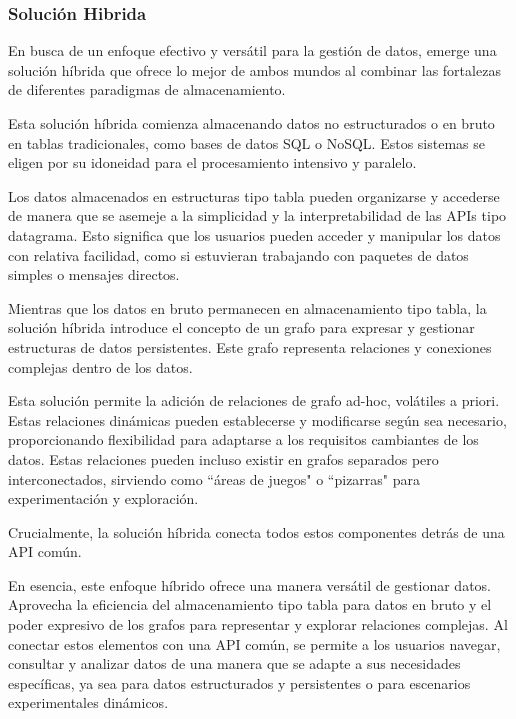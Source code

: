 \documentclass[pdflatex,sn-mathphys-num]{sn-jnl}
\theoremstyle{thmstyleone}%
\theoremstyle{thmstyletwo}%
\theoremstyle{thmstylethree}%
\begin{document}
\subsubsection{Solución Hibrida}

En busca de un enfoque efectivo y versátil para la gestión de datos, emerge una solución híbrida que ofrece lo mejor de ambos mundos al combinar las fortalezas de diferentes paradigmas de almacenamiento.

Esta solución híbrida comienza almacenando datos no estructurados o en bruto en tablas tradicionales, como bases de datos SQL o NoSQL. Estos sistemas se eligen por su idoneidad para el procesamiento intensivo y paralelo.

Los datos almacenados en estructuras tipo tabla pueden organizarse y accederse de manera que se asemeje a la simplicidad y la interpretabilidad de las APIs tipo datagrama. Esto significa que los usuarios pueden acceder y manipular los datos con relativa facilidad, como si estuvieran trabajando con paquetes de datos simples o mensajes directos.

Mientras que los datos en bruto permanecen en almacenamiento tipo tabla, la solución híbrida introduce el concepto de un grafo para expresar y gestionar estructuras de datos persistentes. Este grafo representa relaciones y conexiones complejas dentro de los datos.

Esta solución permite la adición de relaciones de grafo ad-hoc, volátiles a priori. Estas relaciones dinámicas pueden establecerse y modificarse según sea necesario, proporcionando flexibilidad para adaptarse a los requisitos cambiantes de los datos. Estas relaciones pueden incluso existir en grafos separados pero interconectados, sirviendo como ``áreas de juegos" o ``pizarras" para experimentación y exploración.

Crucialmente, la solución híbrida conecta todos estos componentes detrás de una API común.

En esencia, este enfoque híbrido ofrece una manera versátil de gestionar datos. Aprovecha la eficiencia del almacenamiento tipo tabla para datos en bruto y el poder expresivo de los grafos para representar y explorar relaciones complejas. Al conectar estos elementos con una API común, se permite a los usuarios navegar, consultar y analizar datos de una manera que se adapte a sus necesidades específicas, ya sea para datos estructurados y persistentes o para escenarios experimentales dinámicos.
\end{document}
